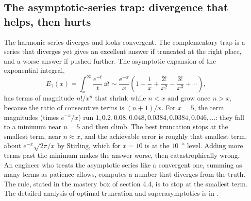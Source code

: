 \subsection{The asymptotic-series trap: divergence that helps, then hurts}

The harmonic series diverges and looks convergent. The complementary
trap is a series that diverges yet gives an excellent answer if
truncated at the right place, and a worse answer if pushed further. The
asymptotic expansion of the exponential integral,
\[
E_{1}(x) = \int_{x}^{\infty} \frac{e^{-t}}{t} \, \dd t \sim
\frac{e^{-x}}{x}\left(1 - \frac{1}{x} + \frac{2!}{x^{2}} -
\frac{3!}{x^{3}} + \cdots\right),
\]
has terms of magnitude $n!/x^{n}$ that shrink while $n < x$ and grow
once $n > x$, because the ratio of consecutive terms is $(n+1)/x$. For
$x = 5$, the term magnitudes (times $e^{-x}/x$) run $1, 0.2, 0.08,
0.048, 0.0384, 0.0384, 0.046, \ldots$: they fall to a minimum near
$n = 5$ and then climb. The best truncation stops at the smallest term,
near $n \approx x$, and the achievable error is roughly that smallest
term, about $e^{-x}\sqrt{2\pi/x}$ by Stirling, which for $x = 10$ is at
the $10^{-5}$ level. Adding more terms past the minimum makes the
answer worse, then catastrophically wrong. An engineer who treats the
asymptotic series like a convergent one, summing as many terms as
patience allows, computes a number that diverges from the truth. The
rule, stated in the mastery box of section 4.4, is to stop at the
smallest term. The detailed analysis of optimal truncation and
superasymptotics is in \cite{text:v2ch04-bender-orszag-1999}.

